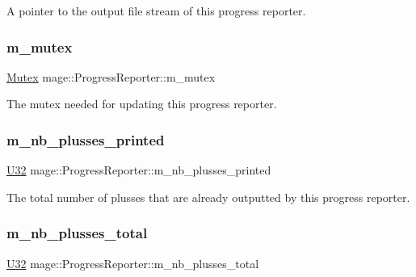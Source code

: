 A pointer to the output file stream of this progress reporter. \hypertarget{classmage_1_1_progress_reporter_a32a499aa1b8fccbc8393fe32305dfeb1}{}\label{classmage_1_1_progress_reporter_a32a499aa1b8fccbc8393fe32305dfeb1} 
\subsubsection{\texorpdfstring{m\+\_\+mutex}{m\_mutex}}
{\footnotesize\ttfamily \hyperlink{classmage_1_1_mutex}{Mutex} mage\+::\+Progress\+Reporter\+::m\+\_\+mutex\hspace{0.3cm}{\ttfamily [private]}}

The mutex needed for updating this progress reporter. \hypertarget{classmage_1_1_progress_reporter_a0279302ea777f9db2735fff1a8ae2d26}{}\label{classmage_1_1_progress_reporter_a0279302ea777f9db2735fff1a8ae2d26} 
\subsubsection{\texorpdfstring{m\+\_\+nb\+\_\+plusses\+\_\+printed}{m\_nb\_plusses\_printed}}
{\footnotesize\ttfamily \hyperlink{namespacemage_a41c104c036fba3756a74e19f793eeaa1}{U32} mage\+::\+Progress\+Reporter\+::m\+\_\+nb\+\_\+plusses\+\_\+printed\hspace{0.3cm}{\ttfamily [private]}}

The total number of plusses that are already outputted by this progress reporter. \hypertarget{classmage_1_1_progress_reporter_a9afda919e0fa57c8aa7a6667385318c9}{}\label{classmage_1_1_progress_reporter_a9afda919e0fa57c8aa7a6667385318c9} 
\subsubsection{\texorpdfstring{m\+\_\+nb\+\_\+plusses\+\_\+total}{m\_nb\_plusses\_total}}
{\footnotesize\ttfamily \hyperlink{namespacemage_a41c104c036fba3756a74e19f793eeaa1}{U32} mage\+::\+Progress\+Reporter\+::m\+\_\+nb\+\_\+plusses\+\_\+total\hspace{0.3cm}{\ttfamily [private]}}

